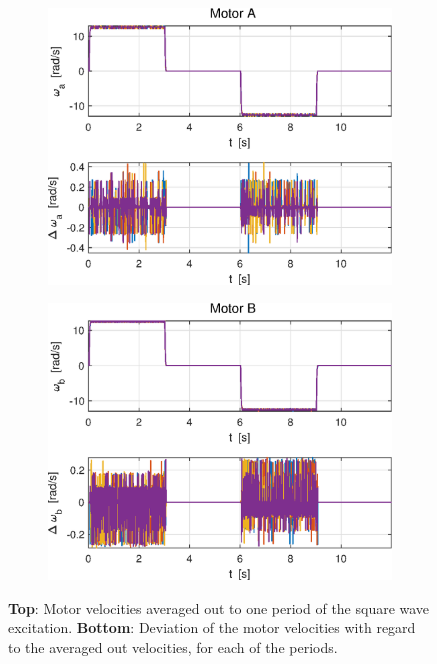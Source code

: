 \documentclass[a4paper,kul]{kulakarticle} %
\begin{document}
\begin{figure}[htp!]
	\centering
	\begin{subfigure}[b]{0.49\textwidth}
		\centering
		\includegraphics[width=\textwidth]{omegaA_deltaomegaA.eps}
	\end{subfigure}
	\hfill
	\begin{subfigure}[b]{0.49\textwidth}  
		\centering 
		\includegraphics[width=\textwidth]{omegaB_deltaomegaB.eps}
	\end{subfigure}
	\caption{\textbf{Top}: Motor velocities averaged out to one period of the square wave excitation. \textbf{Bottom}: Deviation of the motor velocities with regard to the averaged out velocities, for each of the periods.} 
	\label{fig:omega_deltaomega}
\end{figure}
\end{document}
